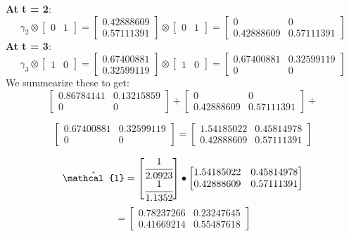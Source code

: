 \textbf{At t = 2}:
\[
\gamma_2 \otimes \begin{bmatrix}
    0 & 1 \end{bmatrix} = \begin{bmatrix}
        0.42888609 \\ 0.57111391
    \end{bmatrix} \otimes \begin{bmatrix}
        0 & 1 \end{bmatrix} = \begin{bmatrix}
            0 & 0 \\ 0.42888609 & 0.57111391
        \end{bmatrix}
\]
\textbf{At t = 3}:
\[
\gamma_3 \otimes \begin{bmatrix}
    1 & 0 \end{bmatrix} = \begin{bmatrix}
        0.67400881 \\ 0.32599119
    \end{bmatrix} \otimes \begin{bmatrix}
        1 & 0 \end{bmatrix} = \begin{bmatrix}
            0.67400881 & 0.32599119 \\ 0 & 0
        \end{bmatrix}
\]
We summearize these to get:
\[
    \begin{bmatrix}
        0.86784141 & 0.13215859 \\
    0 & 0           
    \end{bmatrix} + \begin{bmatrix}
        0 & 0 \\ 0.42888609 & 0.57111391
    \end{bmatrix} +
\] 

\[ \begin{bmatrix}
        0.67400881 & 0.32599119 \\ 0 & 0
    \end{bmatrix} = \begin{bmatrix}    
        1.54185022 & 0.45814978 \\
        0.42888609 & 0.57111391
    \end{bmatrix}
\]

\[
\hat{\mathcal{l}} = \begin{bmatrix}
    \cfrac{1}{2.0923} \\ \cfrac{1}{1.1352}
\end{bmatrix} \bullet \begin{bmatrix}    
    1.54185022 & 0.45814978 \\
    0.42888609 & 0.57111391
\end{bmatrix}
\] 
\[ = \begin{bmatrix}
    0.78237266 & 0.23247645 \\
    0.41669214 & 0.55487618
\end{bmatrix}
\]


